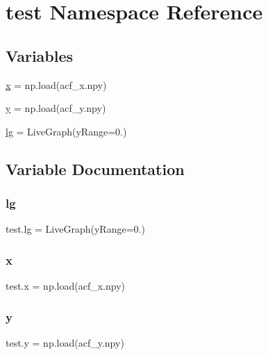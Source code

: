 \hypertarget{namespacetest}{}\section{test Namespace Reference}
\label{namespacetest}
\subsection*{Variables}
\begin{DoxyCompactItemize}
\item 
\hyperlink{namespacetest_accf9c2b29590b2e2d68bb2614364444e}{x} = np.\+load(\textquotesingle{}acf\+\_\+x.\+npy\textquotesingle{})
\item 
\hyperlink{namespacetest_a8e35cd41a1bbd5493b663b19c9df1d1d}{y} = np.\+load(\textquotesingle{}acf\+\_\+y.\+npy\textquotesingle{})
\item 
\hyperlink{namespacetest_a87d947ef7b0fcf728e1e7d6ec65c865f}{lg} = Live\+Graph(y\+Range=0.)
\end{DoxyCompactItemize}


\subsection{Variable Documentation}
\mbox{\label{namespacetest_a87d947ef7b0fcf728e1e7d6ec65c865f}} 
\subsubsection{\texorpdfstring{lg}{lg}}
{\footnotesize\ttfamily test.\+lg = Live\+Graph(y\+Range=0.)}

\mbox{\label{namespacetest_accf9c2b29590b2e2d68bb2614364444e}} 
\subsubsection{\texorpdfstring{x}{x}}
{\footnotesize\ttfamily test.\+x = np.\+load(\textquotesingle{}acf\+\_\+x.\+npy\textquotesingle{})}

\mbox{\label{namespacetest_a8e35cd41a1bbd5493b663b19c9df1d1d}} 
\subsubsection{\texorpdfstring{y}{y}}
{\footnotesize\ttfamily test.\+y = np.\+load(\textquotesingle{}acf\+\_\+y.\+npy\textquotesingle{})}

